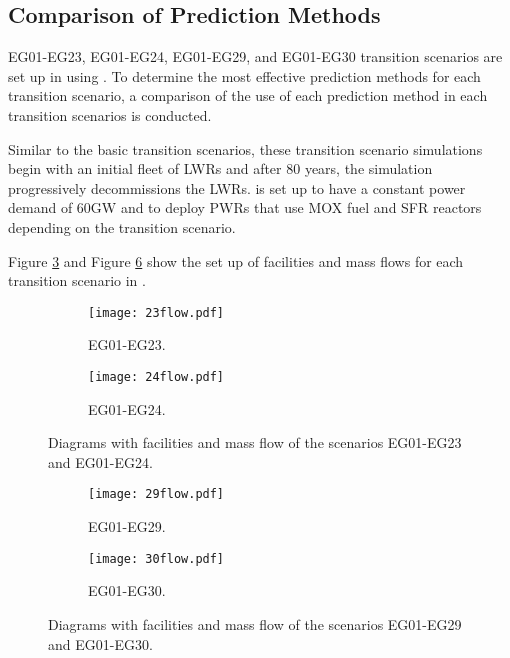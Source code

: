 \subsection{Comparison of Prediction Methods}

EG01-EG23, EG01-EG24, EG01-EG29, and EG01-EG30 transition scenarios
are set up in \Cyclus using \deploy. 
To determine the most effective \deploy prediction methods for 
each transition scenario, a
comparison of the use of each prediction method in each 
transition scenarios is conducted. 

Similar to the basic transition scenarios, these transition scenario 
simulations begin with an initial fleet of \gls{LWR}s and after 
80 years, the simulation progressively decommissions the \gls{LWR}s. 
\Deploy is set up to have a constant power demand of 60GW and to 
deploy \gls{PWR}s that use \gls{MOX} fuel and \gls{SFR} reactors 
depending on the transition scenario. 

Figure \ref{fig:eg2324} and Figure \ref{fig:eg2930} 
show the set up of facilities and mass flows for 
each transition scenario in \Cyclus. 

\begin{figure}[]
	\centering
	\begin{subfigure}[t]{\textwidth}
		\centering
		\texttt{[image: 23flow.pdf]} 
		\caption{EG01-EG23.}
		\label{fig:23flow}
	\end{subfigure}
	\vspace{1cm}
	\begin{subfigure}[t]{\textwidth}
		\centering
		\texttt{[image: 24flow.pdf]} 
		\caption{EG01-EG24.}
		\label{fig:24flow}
	\end{subfigure}
	\hfill
	\caption{Diagrams with facilities and mass flow of the scenarios EG01-EG23 and EG01-EG24.}
	\label{fig:eg2324}
\end{figure}

\begin{figure}[]
	\centering
	\begin{subfigure}[t]{\textwidth}
		\centering
		\texttt{[image: 29flow.pdf]} 
		\caption{EG01-EG29.}
		\label{fig:29flow}
	\end{subfigure}
	\vspace{1cm}
	\begin{subfigure}[t]{\textwidth}
		\centering
		\texttt{[image: 30flow.pdf]} 
		\caption{EG01-EG30.}
		\label{fig:30flow}
	\end{subfigure}
	\hfill
	\caption{Diagrams with facilities and mass flow of the scenarios EG01-EG29 and EG01-EG30.}
	\label{fig:eg2930}
\end{figure}

